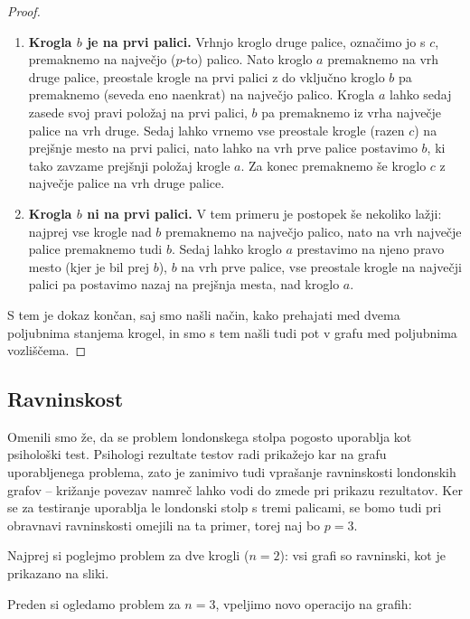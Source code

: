 \documentclass[11pt,a4paper]{article}
\theoremstyle{definition} %
\theoremstyle{plain} %
\begin{document}
\begin{proof}
    \begin{enumerate}
        \item \textbf{Krogla $b$ je na prvi palici.}
        Vrhnjo kroglo druge palice, označimo jo s $c$, premaknemo na največjo ($p$-to) palico. Nato kroglo $a$ premaknemo na vrh druge palice, preostale krogle na prvi palici z do vključno kroglo $b$ pa premaknemo (seveda eno naenkrat) na največjo palico. Krogla $a$ lahko sedaj zasede svoj pravi položaj na prvi palici, $b$ pa premaknemo iz vrha največje palice na vrh druge. Sedaj lahko vrnemo vse preostale krogle (razen $c$) na prejšnje mesto na prvi palici, nato lahko na vrh prve palice postavimo $b$, ki tako zavzame prejšnji položaj krogle $a$. Za konec premaknemo še kroglo $c$ z največje palice na vrh druge palice.
        \item \textbf{Krogla $b$ ni na prvi palici.}
        V tem primeru je postopek še nekoliko lažji: najprej vse krogle nad $b$ premaknemo na največjo palico, nato na vrh največje palice premaknemo tudi $b$. Sedaj lahko kroglo $a$ prestavimo na njeno pravo mesto (kjer je bil prej $b$), $b$ na vrh prve palice, vse preostale krogle na največji palici pa postavimo nazaj na prejšnja mesta, nad kroglo $a$.
    \end{enumerate}
    S tem je dokaz končan, saj smo našli način, kako prehajati med dvema poljubnima stanjema krogel, in smo s tem našli tudi pot v grafu med poljubnima vozliščema.
\end{proof}

\subsection{Ravninskost}

Omenili smo že, da se problem londonskega stolpa pogosto uporablja kot psihološki test. Psihologi rezultate testov radi prikažejo kar na grafu uporabljenega problema, zato je zanimivo tudi vprašanje ravninskosti londonskih grafov -- križanje povezav namreč lahko vodi do zmede pri prikazu rezultatov. Ker se za testiranje uporablja le londonski stolp s tremi palicami, se bomo tudi pri obravnavi ravninskosti omejili na ta primer, torej naj bo $p=3$.

Najprej si poglejmo problem za dve krogli ($n=2$): vsi grafi so ravninski, kot je prikazano na sliki.

Preden si ogledamo problem za $n=3$, vpeljimo novo operacijo na grafih:
\end{document}
